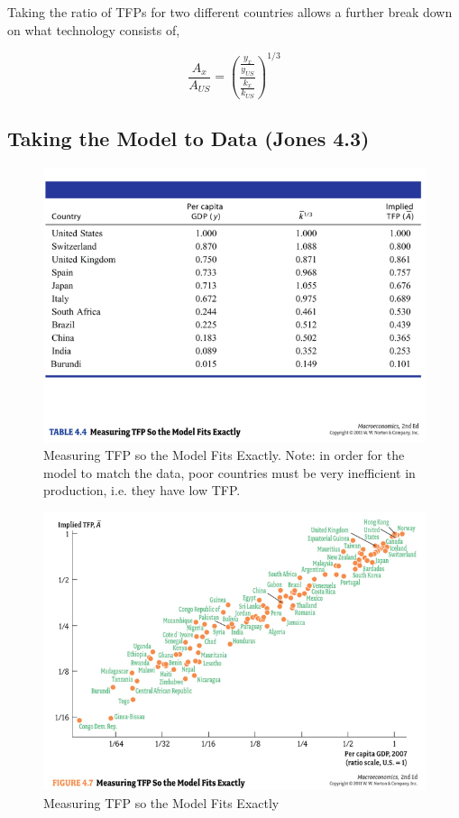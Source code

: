 \documentclass[12pt]{article}
\begin{document}
Taking the ratio of TFPs for two different countries allows a further break down on what technology consists of,

\begin{equation*}
 \frac{A_{x}}{A_{US}}=\left(\frac{\frac{y_{x}}{y_{US}}}{\frac{k_{x}}{k_{US}}}\right)^{1/3}
\end{equation*}%

\subsection{Taking the Model to Data (Jones 4.3)}

\begin{figure}[H]
\caption{Measuring TFP so the Model Fits Exactly. Note: in order for the model to match the data, poor countries must be very inefficient in production, i.e. they have low TFP.}
\centering
\includegraphics[width=120mm, scale=0.5]{Table_4-4.png}
\end{figure}

\begin{figure}[H]
\caption{Measuring TFP so the Model Fits Exactly}
\centering
\includegraphics[width=120mm, scale=0.5]{Figure_4-7.png}
\end{figure}  
\end{document}
